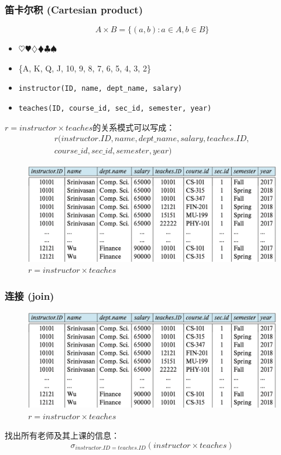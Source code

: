 \documentclass[aspectratio=169, 14pt]{beamer}
\begin{document}
\begin{frame}
    \frametitle{笛卡尔积 (Cartesian product)}
\[A \times B = \{(a, b): a \in A, b \in B\}\]
\pause
\begin{itemize}
    \item $\heartsuit\varheart\diamondsuit\vardiamond\clubsuit\spadesuit$
    \item \{A, K, Q, J, 10, 9, 8, 7, 6, 5, 4, 3, 2\}
\end{itemize}
\pause
\begin{itemize}
    \item \texttt{instructor(ID, name, dept\_name, salary)}
    \item \texttt{teaches(ID, course\_id, sec\_id, semester, year)}
   \end{itemize} 
\end{frame}

\begin{frame}

   $r = instructor \times teaches$的关系模式可以写成：
   \begin{equation*}
       \begin{split}
   r(instructor.ID, name, dept\_name, salary, teaches.ID, \\ course\_id, sec\_id, semester, year)
       \end{split}
   \end{equation*}

    \begin{figure}
        \includegraphics[width=.8\textwidth]{table/join}
        \caption*{$r = instructor \times teaches$}
    \end{figure}
\end{frame}

\begin{frame}
    \frametitle{连接 (join)}
    \begin{figure}
        \includegraphics[width=.6\textwidth]{table/join}
        \caption*{$r = instructor \times teaches$}
    \end{figure}
    找出所有老师及其上课的信息：
    {\large \[\sigma_{instructor.ID=teaches.ID}(instructor \times teaches)\]}
\end{frame}
\end{document}

